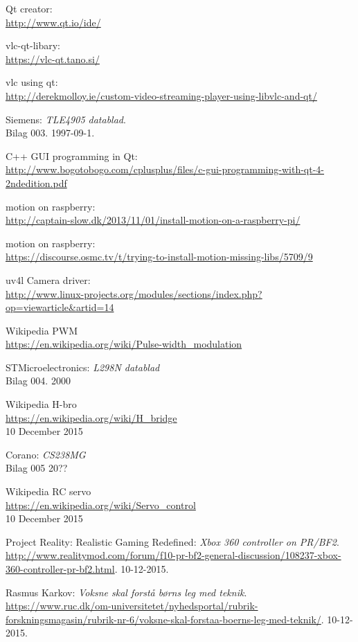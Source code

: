 \begin{thebibliography}{2}
 Qt creator: \\
\url{http://www.qt.io/ide/}

 vlc-qt-libary: \\
\url{https://vlc-qt.tano.si/}

 vlc using qt: \\
\url{http://derekmolloy.ie/custom-video-streaming-player-using-libvlc-and-qt/}

 Siemens: \textit{TLE4905 datablad}. \\
Bilag 003. 1997-09-1.

 C++ GUI programming in Qt: \\
\url{http://www.bogotobogo.com/cplusplus/files/c-gui-programming-with-qt-4-2ndedition.pdf}

 motion on raspberry: \\
\url{http://captain-slow.dk/2013/11/01/install-motion-on-a-raspberry-pi/}

 motion on raspberry: \\
\url{https://discourse.osmc.tv/t/trying-to-install-motion-missing-libs/5709/9}

 uv4l Camera driver: \\
\url{http://www.linux-projects.org/modules/sections/index.php?op=viewarticle&artid=14}

 Wikipedia PWM \\
\url{https://en.wikipedia.org/wiki/Pulse-width_modulation}

 STMicroelectronics: \textit{L298N datablad} \\
Bilag 004. 2000

 Wikipedia H-bro \\
\url{https://en.wikipedia.org/wiki/H_bridge}\\
10 December 2015

 Corano: \textit{CS238MG}\\
Bilag 005 20??

 Wikipedia RC servo \\
\url{https://en.wikipedia.org/wiki/Servo_control}\\
10 December 2015

 Project Reality: Realistic Gaming Redefined: \textit{Xbox 360 controller on PR/BF2}. \\
\url{http://www.realitymod.com/forum/f10-pr-bf2-general-discussion/108237-xbox-360-controller-pr-bf2.html}. 10-12-2015.

 Rasmus Karkov: \textit{Voksne skal forstå børns leg med teknik}. \\
\url{https://www.ruc.dk/om-universitetet/nyhedsportal/rubrik-forskningsmagasin/rubrik-nr-6/voksne-skal-forstaa-boerns-leg-med-teknik/}. 10-12-2015.

\end{thebibliography}